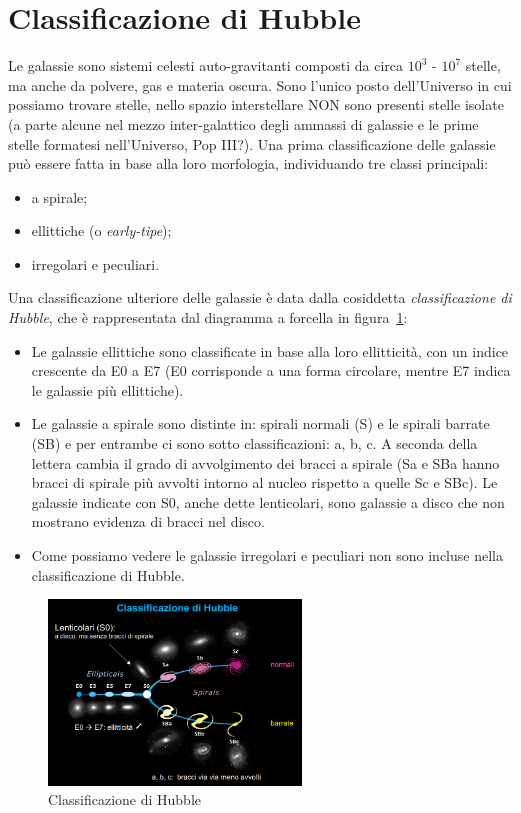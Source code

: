\section{Classificazione di Hubble}
Le galassie sono sistemi celesti auto-gravitanti composti da circa $10^3$ - $10^7$ stelle, ma anche da polvere, gas e materia oscura. Sono l'unico posto dell'Universo in cui possiamo trovare stelle, nello spazio interstellare NON sono presenti stelle isolate (a parte alcune nel mezzo inter-galattico degli ammassi di galassie e le prime stelle formatesi nell’Universo, Pop III?).
Una prima classificazione delle galassie può essere fatta in base alla loro morfologia, individuando tre classi principali:
\begin{itemize}
	\item a spirale;
	\item ellittiche (o \textit{early-tipe});
	\item irregolari e peculiari.
\end{itemize}

Una classificazione ulteriore delle galassie è data dalla cosiddetta \emph{classificazione di Hubble}, che è rappresentata
dal diagramma a forcella in figura~\ref{fig:classificazione-di-hubble}:
\begin{itemize}
	\item Le galassie ellittiche sono classificate in base alla loro ellitticità, con un indice crescente da E0 a E7 (E0 corrisponde a una forma circolare, mentre E7 indica le galassie più ellittiche).
	\item Le galassie a spirale sono distinte in: spirali normali (S) e le spirali barrate (SB) e per entrambe ci sono sotto classificazioni: a, b, c. A seconda della lettera cambia il grado di avvolgimento dei bracci a spirale (Sa e SBa hanno bracci di spirale più avvolti intorno al nucleo rispetto a quelle Sc e SBc). Le galassie indicate con S0, anche dette lenticolari, sono galassie a disco che non mostrano evidenza di bracci nel disco.
	\item Come possiamo vedere le galassie irregolari e peculiari non sono incluse nella classificazione di Hubble.
\end{itemize}

\begin{figure}
	\centering
	\includegraphics[width=0.6\textwidth]{immagini/classificazione-di-hubble.png}
	\caption{Classificazione di Hubble}
	\label{fig:classificazione-di-hubble}
\end{figure}

